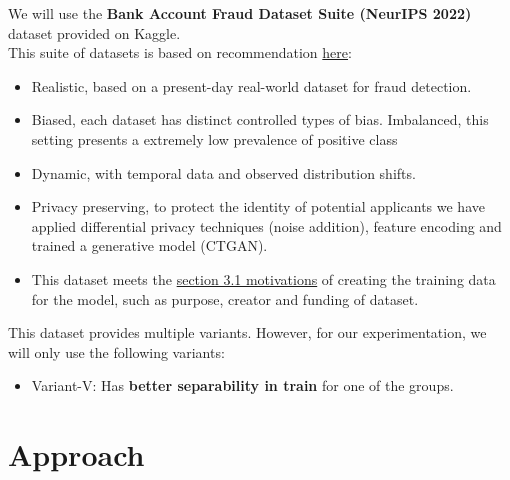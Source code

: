 \documentclass[10pt,twocolumn,letterpaper]{article}
\begin{document}
We will use the \textbf{Bank Account Fraud Dataset Suite (NeurIPS 2022)}\cite{1} dataset provided on Kaggle. \\

This suite of datasets is based on recommendation \href{https://arxiv.org/abs/1803.09010}{here}:
\begin{itemize}
    \item Realistic, based on a present-day real-world dataset for fraud detection.
    \item Biased, each dataset has distinct controlled types of bias. Imbalanced, this setting presents a extremely low prevalence of positive class
    \item Dynamic, with temporal data and observed distribution shifts.
    \item Privacy preserving, to protect the identity of potential applicants we have applied differential privacy techniques (noise addition), feature encoding and trained a generative model (CTGAN).
    \item This dataset meets the \href{https://arxiv.org/abs/1803.09010}{section 3.1 motivations} of creating the training data for the model, such as purpose, creator and funding of dataset.
\end{itemize}

This dataset provides multiple variants. However, for our experimentation, we will only use the following variants:
\begin{itemize}
    \item Variant-V: Has \textbf{better separability in train} for one of the groups.
\end{itemize}


\section{Approach}
\end{document}

